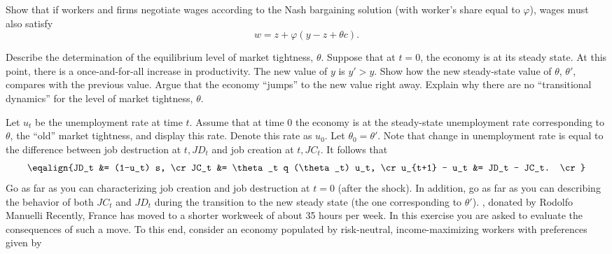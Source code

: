   Show that if workers and firms negotiate wages according to
the Nash bargaining solution (with worker's share equal to $\varphi$),
wages must also satisfy
$$ w = z + \varphi (y - z + \theta c). $$

  Describe the determination of the equilibrium level
 of market tightness, $\theta$.
\medskip
{}  Suppose that at $t = 0$, the economy is at its steady
state.  At this point, there is a once-and-for-all
increase in productivity.  The new value of $y$ is $y' > y$.
Show how the new steady-state value of $\theta$, $\theta'$, compares
with the previous value.  Argue that the economy ``jumps'' to the new
value right away.  Explain why there are no ``transitional dynamics'' for
the level of market tightness, $\theta$.
\medskip

  Let $u_t$ be the unemployment rate at time $t$.
  Assume that at time $0$ the economy is at the steady-state
 unemployment rate corresponding to $\theta$, the ``old''
market tightness, and display this rate.  Denote this rate as $u_0$.
  Let $\theta_0 = \theta'$.  Note that change in unemployment rate is
equal to the difference between job destruction at $t, JD_t$ and
job creation at $t, JC_t$.  It follows that
$$ \eqalign{JD_t &= (1-u_t) s,  \cr
    JC_t &= \theta_t q (\theta_t) u_t,  \cr
    u_{t+1} - u_t &= JD_t - JC_t.  \cr }  $$
    Go as far as you can characterizing job creation and job
destruction at $t = 0$ (after the shock).  In addition, go as far
as you can describing the behavior of both $JC_t$ and $JD_t$ during
the transition to the new steady state (the one corresponding to $\theta'$).
\medskip
{} , donated by
Rodolfo Manuelli
\medskip \noindent
Recently, France has moved to a shorter workweek of about 35 hours per week.   In this
exercise you are asked to evaluate the consequences of such a move.
To this end, consider an economy populated by risk-neutral, income-maximizing  workers with preferences given by

